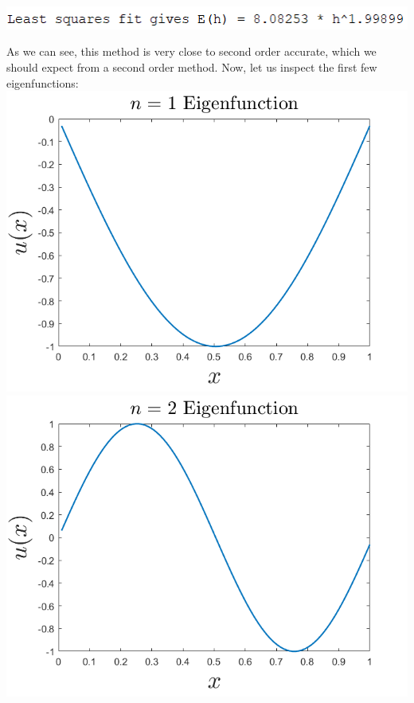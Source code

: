 \documentclass{article}
\begin{document}
\begin{enumerate}
\begin{center}
        \newline
        \includegraphics[]{errorOrder.PNG}
    \end{center}
    As we can see, this method is very close to second order accurate, which we should expect from a second order method. Now, let us inspect the first few eigenfunctions:
    \newline
    \includegraphics[scale = 0.4]{1aeig1.png}
    \includegraphics[scale = 0.4]{1aeig2.png}
    \newline

\end{enumerate}
\end{document}
